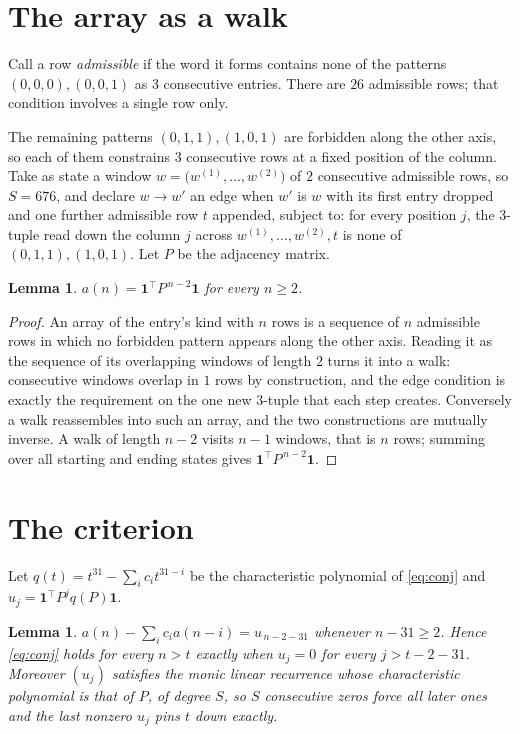 \documentclass[11pt,a4paper]{article}
\theoremstyle{plain}
\newtheorem{lemma}[theorem]{Lemma}
\theoremstyle{definition}
\begin{document}
\section{The array as a walk}

Call a row \emph{admissible} if the word it forms contains none of the patterns
$(0,0,0), (0,0,1)$ as $3$ consecutive entries. There are $26$ admissible rows; that condition
involves a single row only.

The remaining patterns $(0,1,1), (1,0,1)$ are forbidden along the other axis, so each of them
constrains $3$ consecutive rows at a fixed position of the column. Take as state a
window $w=\bigl(w^{(1)},\dots,w^{(2)}\bigr)$ of $2$ consecutive admissible
rows, so $S=676$, and declare $w\to w'$ an edge when $w'$ is $w$ with its first entry
dropped and one further admissible row $t$ appended, subject to: for every position
$j$, the $3$-tuple read down the column $j$ across $w^{(1)},\dots,w^{(2)},t$
is none of $(0,1,1), (1,0,1)$. Let $P$ be the adjacency matrix.

\begin{lemma}\label{lem:walk}
$a(n)=\mathbf{1}^{\!\top}P^{\,n-2}\mathbf{1}$ for every $n\ge2$.
\end{lemma}

\begin{proof}
An array of the entry's kind with $n$ rows is a sequence of $n$ admissible rows in
which no forbidden pattern appears along the other axis. Reading it as the sequence of its
overlapping windows of length $2$ turns it into a walk: consecutive windows overlap in
$1$ rows by construction, and the edge condition is exactly the requirement on the one
new $3$-tuple that each step creates. Conversely a walk reassembles into such an array,
and the two constructions are mutually inverse. A walk of length $n-2$ visits $n-1$
windows, that is $n$ rows; summing over all starting and ending states gives
$\mathbf{1}^{\!\top}P^{\,n-2}\mathbf{1}$.
\end{proof}

\section{The criterion}

Let $q(t)=t^{31}-\sum_i c_i t^{31-i}$ be the characteristic polynomial of
\eqref{eq:conj} and $u_j=\mathbf{1}^{\!\top}P^{j}q(P)\mathbf{1}$.

\begin{lemma}\label{lem:crit}
$a(n)-\sum_i c_i a(n-i)=u_{\,n-2-31}$ whenever $n-31\ge2$. Hence
\eqref{eq:conj} holds for every $n>t$ exactly when $u_j=0$ for every
$j>t-2-31$. Moreover $(u_j)$ satisfies the monic linear recurrence whose
characteristic polynomial is that of $P$, of degree $S$, so $S$ consecutive zeros force all
later ones and the last nonzero $u_j$ pins $t$ down exactly.
\end{lemma}
\end{document}
